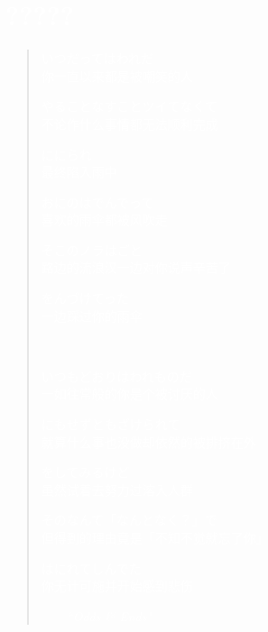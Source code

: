 \documentclass{article}
\theoremstyle{nonumberplain}
\begin{document}
\section*{\textcolor{white}{?????}}
\begin{quote}

	\textcolor{white}{いつだってはわれだ\\
		你一直以来都是被嘲笑的人}

	\textcolor{white}{やることなすことツイてなくて\\
		不论作什么事情都无法顺利完成}

	\textcolor{white}{ににられ\\
		最终陷入雨中}

	\textcolor{white}{おにのはでんでって\\
		喜欢的雨伞都被风吹走}

	\textcolor{white}{そこのノラはごと\\
		路边的流浪汉一边对你说声辛苦了}

	\textcolor{white}{をんづけてった\\
		一边踩过你的雨伞}

	\ \par

	\textcolor{white}{いつもどおりはわれものだ\\
		一如往常般的你是个被讨厌的人}

	\textcolor{white}{にもせずともざけられて\\
		就算什么事也没做却依然的被排挤在外}

	\textcolor{white}{をしてみるけど\\
		虽然试着去努力过溶入人群}

	\textcolor{white}{そのなんて「なんとなく？」で\\
		但得到的理由竟是「不知不觉就忘了你」}

	\textcolor{white}{はにれてしんでた\\
		你无计可施并开始感到悲伤}
	\begin{flushright}\textcolor{white}{------}\em{\textcolor{white}{``Odds \& Ends"}}\end{flushright}
\end{quote}
\end{document}
